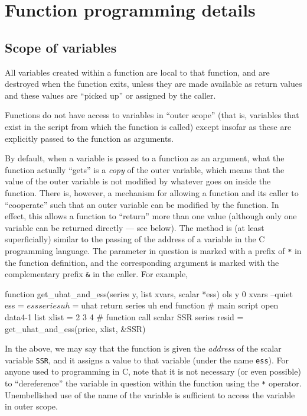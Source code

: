 \section{Function programming details}
\label{func-details}

\subsection{Scope of variables}
\label{funscope}

All variables created within a function are local to that function,
and are destroyed when the function exits, unless they are made
available as return values and these values are ``picked up'' or
assigned by the caller.
    
Functions do not have access to variables in ``outer scope'' (that is,
variables that exist in the script from which the function is called)
except insofar as these are explicitly passed to the function as
arguments.  

By default, when a variable is passed to a function as an argument,
what the function actually ``gets'' is a \emph{copy} of the outer
variable, which means that the value of the outer variable is not
modified by whatever goes on inside the function.  There is, however,
a mechanism for allowing a function and its caller to ``cooperate''
such that an outer variable can be modified by the function.  In
effect, this allows a function to ``return'' more than one value
(although only one variable can be returned directly --- see below).
The method is (at least superficially) similar to the passing of the
address of a variable in the C programming language.  The parameter in
question is marked with a prefix of \texttt{*} in the function
definition, and the corresponding argument is marked with the
complementary prefix \verb+&+ in the caller.  For example,
%
\begin{code}
      function get_uhat_and_ess(series y, list xvars, scalar *ess)
        ols y 0 xvars --quiet
        ess = $ess
        series uh = $uhat
        return series uh
      end function
      # main script
      open data4-1
      list xlist = 2 3 4
      # function call
      scalar SSR
      series resid = get_uhat_and_ess(price, xlist, &SSR)
\end{code}
%
In the above, we may say that the function is given the \emph{address}
of the scalar variable \texttt{SSR}, and it assigns a value to that
variable (under the name \texttt{ess}).  For anyone used to
programming in C, note that it is not necessary (or even possible) to
``dereference'' the variable in question within the function using the
\texttt{*} operator.  Unembellished use of the name of the variable is
sufficient to access the variable in outer scope.

